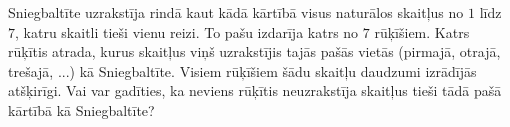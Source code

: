 \documentclass[a4paper,12pt]{article}
\begin{document}
\vspace{10pt}
\begin{problem}
Sniegbaltīte uzrakstīja rindā kaut kādā kārtībā visus 
naturālos skaitļus no $1$ līdz $7$, katru skaitli tieši vienu reizi. 
To pašu izdarīja katrs no $7$ rūķīšiem. Katrs rūķītis atrada, 
kurus skaitļus viņš uzrakstījis tajās pašās vietās 
(pirmajā, otrajā, trešajā, ...) kā Sniegbaltīte. 
Visiem rūķīšiem šādu skaitļu daudzumi izrādījās atšķirīgi. 
Vai var gadīties, ka neviens rūķītis neuzrakstīja skaitļus 
tieši tādā pašā kārtībā kā Sniegbaltīte?
\end{problem}
\end{document}
